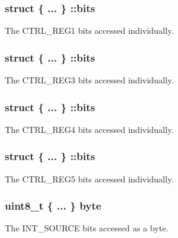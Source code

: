 \subsubsection[{bits}]{\setlength{\rightskip}{0pt plus 5cm}struct \{ ... \} \+::bits}\label{group__accel__module_ga4a58c14f4e860a98e625babccbf8f6c5}
The C\+T\+R\+L\+\_\+\+R\+E\+G1 bits accessed individually. \hypertarget{group__accel__module_ga064c67eed897cddcebf7c8cd41ec1634}{}
\subsubsection[{bits}]{\setlength{\rightskip}{0pt plus 5cm}struct \{ ... \} \+::bits}\label{group__accel__module_ga064c67eed897cddcebf7c8cd41ec1634}
The C\+T\+R\+L\+\_\+\+R\+E\+G3 bits accessed individually. \hypertarget{group__accel__module_gae0a4fc3c856cfd0219b8147d61160f3e}{}
\subsubsection[{bits}]{\setlength{\rightskip}{0pt plus 5cm}struct \{ ... \} \+::bits}\label{group__accel__module_gae0a4fc3c856cfd0219b8147d61160f3e}
The C\+T\+R\+L\+\_\+\+R\+E\+G4 bits accessed individually. \hypertarget{group__accel__module_ga54c7d4070228a0489eb94939cfe9877f}{}
\subsubsection[{bits}]{\setlength{\rightskip}{0pt plus 5cm}struct \{ ... \} \+::bits}\label{group__accel__module_ga54c7d4070228a0489eb94939cfe9877f}
The C\+T\+R\+L\+\_\+\+R\+E\+G5 bits accessed individually. \hypertarget{group__accel__module_ga15e09eabfa347d25f683469fb3c51a2b}{}
\subsubsection[{byte}]{\setlength{\rightskip}{0pt plus 5cm}uint8\+\_\+t \{ ... \} byte}\label{group__accel__module_ga15e09eabfa347d25f683469fb3c51a2b}
The I\+N\+T\+\_\+\+S\+O\+U\+R\+C\+E bits accessed as a byte. \hypertarget{group__accel__module_gad19b6f43f3cc6fafd274b703a69796e9}{}
